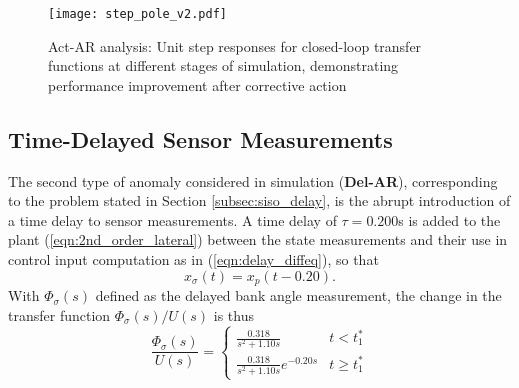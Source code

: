 \begin{figure}[h!]
	\centering
	\texttt{[image: step\_pole\_v2.pdf]}
	\caption{Act-AR analysis: Unit step responses for closed-loop transfer functions at different stages of simulation, demonstrating performance improvement after corrective action}
	\label{fig:step_pole}
\end{figure}

\subsection{Time-Delayed Sensor Measurements}\label{subsec:siso_delay_sims}
The second type of anomaly considered in simulation (\textbf{Del-AR}), corresponding to the problem stated in Section \ref{subsec:siso_delay}, is the abrupt introduction of a time delay to sensor measurements. A time delay of $\tau = 0.200$s is added to the plant (\ref{eqn:2nd_order_lateral}) between the state measurements and their use in control input computation as in (\ref{eqn:delay_diffeq}), so that
\begin{equation}
	x_\sigma(t) = x_p(t - 0.20).
\end{equation}
With $\Phi_\sigma(s)$ defined as the delayed bank angle measurement, the change in the transfer function $\Phi_\sigma(s)/U(s)$ is thus
\begin{equation}
		\frac{\Phi_\sigma(s)}{U(s)} = \begin{cases}
			\frac{0.318}{s^2 + 1.10s} & t < t_1^*\\
			\frac{0.318}{s^2 + 1.10s}e^{-0.20 s} & t \geq t_1^*
		\end{cases} 
\end{equation}

